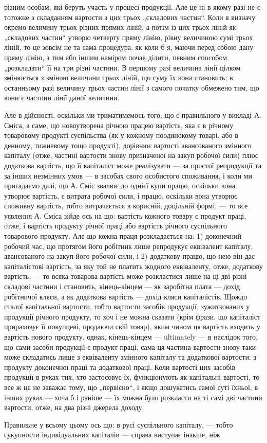 різним особам, які беруть участь у процесі продукції. Але це ні в якому
разі не є тотожне з складанням вартости з цих трьох „складових частин“.
Коли я визначу окремо величину трьох різних прямих ліній, а
потім із цих трьох ліній як „складових частин“ утворю четверту пряму
лінію, рівну величиною сумі трьох ліній, то це зовсім не та сама процедура,
як коли б я, маючи перед собою дану пряму лінію, з тим або
іншим наміром почав ділити, певним способом „розкладати“ її на три
різні частини. В першому разі величина лінії цілком змінюється з зміною
величини трьох ліній, що суму їх вона становить; в останньому разі
величину трьох частин лінії з самого початку обмежено тим, що вони
є частини лінії даної величини.

Але в дійсності, оскільки ми триматимемось того, що є правильного
у викладі А. Сміса, а саме, що новоутворена річною працею вартість,
яка є в річному товаровому продукті суспільства (як у кожному поодинокому
товарі, або в денному, тижневому тощо продукті), дорівнює вартості
авансованого змінного капіталу (отже, частині вартости знову призначеної
на закуп робочої сили) плюс додаткова вартість, що її капіталіст може
реалізувати — за простої репродукції та за інших незмінних умов — в засобах
свого особистого споживання, і коли ми пригадаємо далі, що А.
Сміс звалює до однієї купи працю, оскільки вона утворює вартість, є
витрата робочої сили, і працю, оскільки вона утворює споживну вартість,
тобто витрачається в корисній, доцільній формі, — то все уявлення
А. Сміса зійде ось на що: вартість кожного товару є продукт праці,
отже, і вартість продукту річної праці або вартість річного суспільного
товарового продукту. Але що кожна праця розкладається на: 1) доконечний
робочий час, що протягом його робітник лише репродукує еквівалент
капіталу, авансованого на закуп його робочої сили, і 2) додаткову працю,
що нею він дає капіталістові вартість, за яку той не платить жодного
еквіваленту, отже, додаткову вартість, — то всяка товарова вартість може
розкластися лише на ці дві різні складові частини і становить, кінець-кінцем —
як заробітна плата — дохід робітничої кляси, а як додаткова вартість —
дохід кляси капіталістів. Щождо сталої капітальної вартости, тобто вартости
засобів продукції, зужиткованих у продукції річного продукту, то
хоч і не можна сказати (крім фрази, що капіталіст прираховує її покупцеві,
продаючи свій товар), яким чином ця вартість входить у вартість
нового продукту, однак, кінець-кінцем — ultimately — в наслідок того, що
сами засоби продукції є продукт праці, сама ця частина вартости знову
таки може складатись лише з еквіваленту змінного капіталу та додаткової
вартости: з продукту доконечної праці та додаткової праці. Коли
вартості цих засобів продукції в руках тих, хто застосовує їх, функціонують
як капітальні вартості, то все ж це не заважає тому, що „первісно“,
і якщо дошукатись самої суті їхньої, в інших руках — хоча б і раніше — їх
можна було розкласти на ті самі дві частини вартости, отже, на два
різні джерела доходу.

Правильне у всьому цьому ось що: в русі суспільного капіталу, —
тобто сукупности індивідуальних капіталів — справа виступає інакше, ніж
